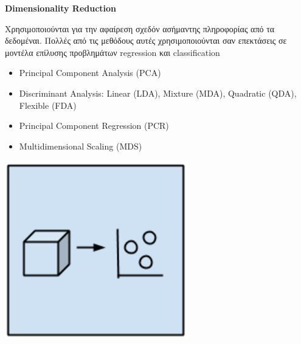 \begin{minipage}{0.5\textwidth}

  \textbf{\large Dimensionality Reduction}

  Χρησιμοποιούνται για την αφαίρεση σχεδόν ασήμαντης πληροφορίας
  από τα δεδομέναι. Πολλές από τις μεθόδους αυτές χρησιμοποιούνται σαν επεκτάσεις σε μοντέλα επίλυσης
  προβλημάτων regression και classification

  \begin{itemize}
    \setlength\itemsep{0em}
    \item{Principal Component Analysis (PCA)}
    \item{Discriminant Analysis: Linear (LDA), Mixture (MDA), Quadratic (QDA), Flexible (FDA)}
    \item{Principal Component Regression (PCR)}
    \item{Multidimensional Scaling (MDS)}
  \end{itemize}
\end{minipage}
\begin{minipage}{0.5\textwidth}
  \begin{center}
    \includegraphics[width=0.6\textwidth]{./images/chapter3/dimensional_reduction_algorithms.png}
  \end{center}
\end{minipage}

